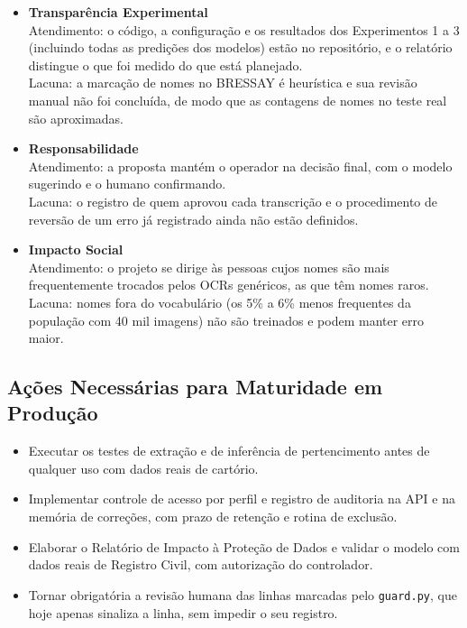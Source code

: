 \documentclass[12pt,a4paper]{article}
\begin{document}
\begin{itemize}
    \item \textbf{Transparência Experimental} \\
    Atendimento: o código, a configuração e os resultados dos Experimentos 1 a 3 (incluindo todas as predições dos modelos) estão no repositório, e o relatório distingue o que foi medido do que está planejado. \\
    Lacuna: a marcação de nomes no BRESSAY é heurística e sua revisão manual não foi concluída, de modo que as contagens de nomes no teste real são aproximadas.

    \item \textbf{Responsabilidade} \\
    Atendimento: a proposta mantém o operador na decisão final, com o modelo sugerindo e o humano confirmando. \\
    Lacuna: o registro de quem aprovou cada transcrição e o procedimento de reversão de um erro já registrado ainda não estão definidos.

    \item \textbf{Impacto Social} \\
    Atendimento: o projeto se dirige às pessoas cujos nomes são mais frequentemente trocados pelos OCRs genéricos, as que têm nomes raros. \\
    Lacuna: nomes fora do vocabulário (os 5\% a 6\% menos frequentes da população com 40 mil imagens) não são treinados e podem manter erro maior.
\end{itemize}

\subsection{Ações Necessárias para Maturidade em Produção}

\begin{itemize}
    \item Executar os testes de extração e de inferência de pertencimento antes de qualquer uso com dados reais de cartório.
    \item Implementar controle de acesso por perfil e registro de auditoria na API e na memória de correções, com prazo de retenção e rotina de exclusão.
    \item Elaborar o Relatório de Impacto à Proteção de Dados e validar o modelo com dados reais de Registro Civil, com autorização do controlador.
    \item Tornar obrigatória a revisão humana das linhas marcadas pelo \texttt{guard.py}, que hoje apenas sinaliza a linha, sem impedir o seu registro.
\end{itemize}
\end{document}
